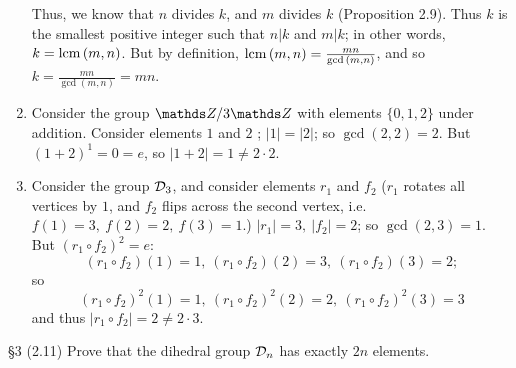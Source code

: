 \documentclass{homework}
\begin{document}
\begin{solution}
\begin{enumerate}[label=(\alph*)]
      Thus, we know that $n$ divides $k$, and $m$ divides $k$ (Proposition 2.9). Thus $k$ is the
      smallest positive integer such that $n|k$ and $m|k$; in other words, $k=\operatorname{lcm}{(m,n)}$. But by
      definition, $\operatorname{lcm}{(m,n)}=\frac{mn}{\gcd{(m,n)}}$, and so $k=\frac{mn}{\gcd{(m,n)}}=mn$.
    \item Consider the group $\Z / 3\Z$ with elements $\{ 0,1,2 \}$ under addition. Consider
      elements $1$ and $2$ ; $\left| 1 \right| =\left| 2 \right|$; so $\gcd{(2,2)}=2$. But
      $(1+2)^{1}=0=e$, so $\left| 1+2 \right| =1\neq 2\cdot 2$.
    \item Consider the group $\mathcal{D}_3$, and consider elements $r_1$ and $ f_2$ ($r_1$ rotates all
      vertices by $1$, and $f_2$ flips across the second vertex, i.e. $f(1)=3,\ f(2)=2,\ f(3)=1$.)
      $\left| r_1 \right| =3,\  \left| f_2 \right|=2 $; so $\gcd{(2,3)}=1$. But $(r_1\circ
      f_2)^2=e$: \[
        (r_1\circ f_2)(1)=1,\ (r_1\circ f_2)(2)=3,\ (r_1\circ f_2)(3)=2
      ;\]  so \[
      (r_1\circ f_2)^2(1)=1,\ (r_1\circ f_2)^2(2)=2,\ (r_1\circ f_2)^2(3)=3
      \] and thus $\left| r_1\circ f_2 \right| =2 \neq 2\cdot 3$.
  \end{enumerate}
\end{solution}



\begin{problem}{\S 3}
  (2.11) Prove that the dihedral group $\mathcal{D}_n$ has exactly $2n$ elements.
\end{problem}
\end{document}
